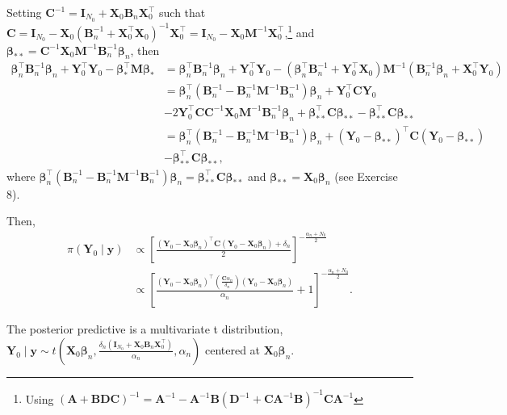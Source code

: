 Setting ${\bm{C}}^{-1}={\bm{I}}_{N_0}+{\bm{X}}_0{\bm{B}}_n{\bm{X}}_0^{\top}$ such that ${\bm{C}}={\bm{I}}_{N_0}-{\bm{X}}_0({\bm{B}}_n^{-1}+{\bm{X}}_0^{\top}{\bm{X}}_0)^{-1}{\bm{X}}_0^{\top}={\bm{I}}_{N_0}-{\bm{X}}_0{\bm{M}}^{-1}{\bm{X}}_0^{\top}$,\footnote{Using $({\bm{A}}+{\bm{B}}{\bm{D}}{\bm{C}})^{-1}={\bm{A}}^{-1}-{\bm{A}}^{-1}{\bm{B}}({\bm{D}}^{-1}+{\bm{C}}{\bm{A}}^{-1}{\bm{B}})^{-1}{\bm{C}}{\bm{A}}^{-1}$} and ${\bm{\bm{\beta}}}_{**}={\bm{C}}^{-1}{\bm{X}}_0{\bm{M}}^{-1}{\bm{B}}_n^{-1}\bm{\beta}_n$, then 
{\footnotesize{
\begin{align*}
	\bm{\beta}_n^{\top}{\bm{B}}_n^{-1}\bm{\beta}_n+{\bm{Y}}_0^{\top}{\bm{Y}}_0-\bm{\beta}_*^{\top}{\bm{M}}\bm{\beta}_*&=
	\bm{\beta}_n^{\top}{\bm{B}}_n^{-1}\bm{\beta}_n+{\bm{Y}}_0^{\top}{\bm{Y}}_0-(\bm{\beta}_n^{\top}{\bm{B}}_n^{-1}+{\bm{Y}}_0^{\top}{\bm{X}}_0){\bm{M}}^{-1}({\bm{B}}_n^{-1}\bm{\beta}_n+{\bm{X}}_0^{\top}{\bm{Y}}_0)\\
	&=\bm{\beta}_n^{\top}({\bm{B}}_n^{-1}-{\bm{B}}_n^{-1}{\bm{M}}^{-1}{\bm{B}}_n^{-1})\bm{\beta}_n+{\bm{Y}}_0^{\top}{\bm{C}}{\bm{Y}}_0\\
	&-2{\bm{Y}}_0^{\top}{\bm{C}}{\bm{C}}^{-1}{\bm{X}}_0{\bm{M}}^{-1}{\bm{B}}_n^{-1}\bm{\beta}_n+{\bm{\bm{\beta}}}_{**}^{\top}{\bm{C}}{\bm{\bm{\beta}}}_{**}-{\bm{\bm{\beta}}}_{**}^{\top}{\bm{C}}{\bm{\bm{\beta}}}_{**}\\
	&=\bm{\beta}_n^{\top}({\bm{B}}_n^{-1}-{\bm{B}}_n^{-1}{\bm{M}}^{-1}{\bm{B}}_n^{-1})\bm{\beta}_n+({\bm{Y}}_0-{\bm{\bm{\beta}}}_{**})^{\top}{\bm{C}}({\bm{Y}}_0-{\bm{\bm{\beta}}}_{**})\\
	&-{\bm{\bm{\beta}}}_{**}^{\top}{\bm{C}}{\bm{\bm{\beta}}}_{**},
\end{align*}
}}
where $\bm{\beta}_n^{\top}({\bm{B}}_n^{-1}-{\bm{B}}_n^{-1}{\bm{M}}^{-1}{\bm{B}}_n^{-1})\bm{\beta}_n={\bm{\bm{\beta}}}_{**}^{\top}{\bm{C}}{\bm{\bm{\beta}}}_{**}$ and $\bm{\beta}_{**}={\bm{X}}_0\bm{\beta}_n$ (see Exercise 8).

Then,
\begin{align*}
	\pi({\bm{Y}}_0\mid {\bm{y}})&\propto\left[\frac{({\bm{Y}}_0-{\bm{X}}_0\bm{\beta}_n)^{\top}{\bm{C}}({\bm{Y}}_0-{\bm{X}}_0\bm{\beta}_n)+\delta_n}{2}\right]^{-\frac{\alpha_n+N_0}{2}}\\
	&\propto\left[\frac{({\bm{Y}}_0-{\bm{X}}_0\bm{\beta}_n)^{\top}\left(\frac{{\bm{C}}\alpha_n}{\delta_n}\right)({\bm{Y}}_0-{\bm{X}}_0\bm{\beta}_n)}{\alpha_n}+1\right]^{-\frac{\alpha_n+N_0}{2}}.
\end{align*}

The posterior predictive is a multivariate t distribution, ${\bm{Y}}_0\mid {\bm{y}}\sim t\left({\bm{X}}_0\bm{\beta}_n,\frac{\delta_n({\bm{I}}_{N_0}+{\bm{X}}_0{\bm{B}}_n{\bm{X}}_0^{\top})}{\alpha_n},\alpha_n\right)$ centered at ${\bm{X}}_0\bm{\beta}_n$.\\

